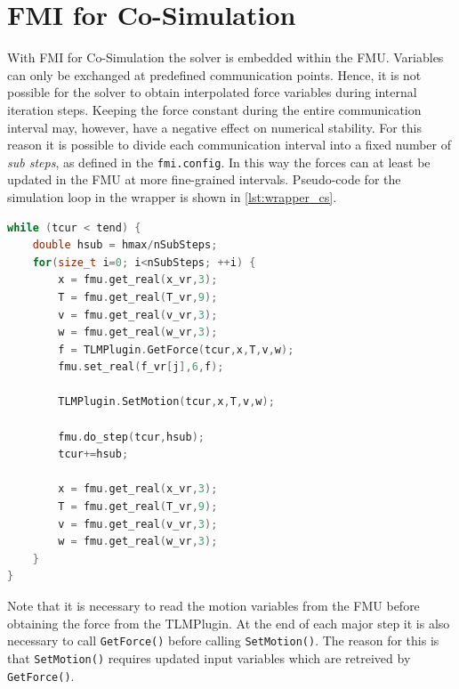 \documentclass[11pt,a4paper]{report}
\begin{document}
\section{FMI for Co-Simulation}
\label{sec:fmi_cs}
With FMI for Co-Simulation the solver is embedded within the FMU.
Variables can only be exchanged at predefined communication points.
Hence, it is not possible for the solver to obtain interpolated force variables during internal iteration steps.
Keeping the force constant during the entire communication interval may, however, have a negative effect on numerical stability.
For this reason it is possible to divide each communication interval into a fixed number of \textit{sub steps}, as defined in the \texttt{fmi.config}.
In this way the forces can at least be updated in the FMU at more fine-grained intervals.
Pseudo-code for the simulation loop in the wrapper is shown in \cref{lst:wrapper_cs}.

\begin{lstlisting}[float, language=c++, basicstyle=\ttfamily\small,floatplacement=htb,caption=Pseudo code for the simulation loop with FMI for co-simulation,label=lst:wrapper_cs]
while (tcur < tend) {
    double hsub = hmax/nSubSteps;
    for(size_t i=0; i<nSubSteps; ++i) {
        x = fmu.get_real(x_vr,3);
        T = fmu.get_real(T_vr,9);
        v = fmu.get_real(v_vr,3);
        w = fmu.get_real(w_vr,3);
        f = TLMPlugin.GetForce(tcur,x,T,v,w);
        fmu.set_real(f_vr[j],6,f);
        
        TLMPlugin.SetMotion(tcur,x,T,v,w);

        fmu.do_step(tcur,hsub);
        tcur+=hsub;

        x = fmu.get_real(x_vr,3);
        T = fmu.get_real(T_vr,9);
        v = fmu.get_real(v_vr,3);
        w = fmu.get_real(w_vr,3);
    }
}
\end{lstlisting}

Note that it is necessary to read the motion variables from the FMU before obtaining the force from the TLMPlugin. 
At the end of each major step it is also necessary to call \texttt{GetForce()} before calling \texttt{SetMotion()}.
The reason for this is that \texttt{SetMotion()} requires updated input variables which are retreived by \texttt{GetForce()}.

\vspace{0cm}
\end{document}
